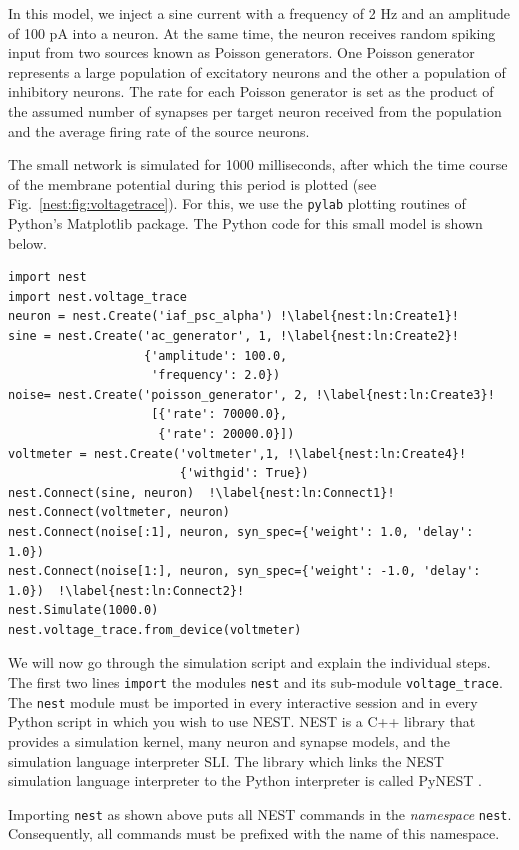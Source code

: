 \documentclass{article}
\begin{document}
In this model, we inject a sine current with a frequency of 2 Hz and
an amplitude of 100 pA into a neuron. At the same time, the neuron
receives random spiking input from two sources known as Poisson
generators. One Poisson generator represents a large population of
excitatory neurons and the other a population of inhibitory
neurons. The rate for each Poisson generator is set as the product of
the assumed number of synapses per target neuron received from the 
population and the average firing rate of the source neurons.

The small network is simulated for 1000 milliseconds, after which the
time course of the membrane potential during this period is plotted
(see Fig.~\ref{nest:fig:voltagetrace}). For this, we use the
\lstinline!pylab! plotting routines of Python's Matplotlib package.
The Python code for this small model is shown below.

\begin{lstlisting}
import nest
import nest.voltage_trace
neuron = nest.Create('iaf_psc_alpha') !\label{nest:ln:Create1}!
sine = nest.Create('ac_generator', 1, !\label{nest:ln:Create2}!
                   {'amplitude': 100.0,
                    'frequency': 2.0})
noise= nest.Create('poisson_generator', 2, !\label{nest:ln:Create3}!
                    [{'rate': 70000.0}, 
                     {'rate': 20000.0}])
voltmeter = nest.Create('voltmeter',1, !\label{nest:ln:Create4}!
                        {'withgid': True})
nest.Connect(sine, neuron)  !\label{nest:ln:Connect1}!
nest.Connect(voltmeter, neuron)
nest.Connect(noise[:1], neuron, syn_spec={'weight': 1.0, 'delay': 1.0}) 
nest.Connect(noise[1:], neuron, syn_spec={'weight': -1.0, 'delay': 1.0})  !\label{nest:ln:Connect2}!
nest.Simulate(1000.0)
nest.voltage_trace.from_device(voltmeter)
\end{lstlisting}
We will now go through the simulation script and explain the
individual steps. The first two lines \lstinline!import! the modules
\lstinline!nest!  and its sub-module \lstinline!voltage_trace!. The
\lstinline!nest!  module must be imported in every interactive session
and in every Python script in which you wish to use NEST. NEST is a
C++ library that provides a simulation kernel, many neuron and synapse
models, and the simulation language interpreter SLI. The library which
links the NEST simulation language interpreter to the Python
interpreter is called PyNEST \citep{Eppler09_12}. 

Importing \lstinline!nest! as shown above puts all NEST commands in
the \emph{namespace} \lstinline!nest!. Consequently, all commands must
be prefixed with the name of this namespace.
 
\end{document}
